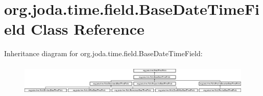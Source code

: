 \hypertarget{classorg_1_1joda_1_1time_1_1field_1_1_base_date_time_field}{\section{org.\-joda.\-time.\-field.\-Base\-Date\-Time\-Field Class Reference}
\label{classorg_1_1joda_1_1time_1_1field_1_1_base_date_time_field}
}
Inheritance diagram for org.\-joda.\-time.\-field.\-Base\-Date\-Time\-Field\-:\begin{figure}[H]
\begin{center}
\leavevmode
\includegraphics[height=1.513514cm]{classorg_1_1joda_1_1time_1_1field_1_1_base_date_time_field}
\end{center}
\end{figure}
